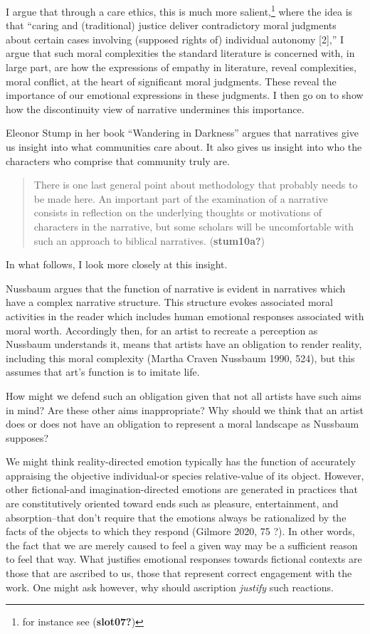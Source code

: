 \documentclass[12pt]{book}
\theoremstyle{definition}
\theoremstyle{remark}
\begin{document}
I argue that through a care ethics, this is much more salient,\footnote{for instance see (\textbf{slot07?})} where the idea is that ``caring and (traditional) justice deliver contradictory moral judgments about certain cases involving (supposed rights of) individual autonomy {[}2{]},'' I argue that such moral complexities the standard literature is concerned with, in large part, are how the expressions of empathy in literature, reveal complexities, moral conflict, at the heart of significant moral judgments. These reveal the importance of our emotional expressions in these judgments. I then go on to show how the discontinuity view of narrative undermines this importance.

Eleonor Stump in her book ``Wandering in Darkness'' argues that narratives give us insight into what communities care about. It also gives us insight into who the characters who comprise that community truly are.

\begin{quote}
There is one last general point about methodology that probably needs to be made here. An important part of the examination of a narrative consists in reflection on the underlying thoughts or motivations of characters in the narrative, but some scholars will be uncomfortable with such an approach to biblical narratives. (\textbf{stum10a?})
\end{quote}

\noindent In what follows, I look more closely at this insight.

Nussbaum argues that the function of narrative is evident in narratives which have a complex narrative structure. This structure evokes associated moral activities in the reader which includes human emotional responses associated with moral worth. Accordingly then, for an artist to recreate a perception as Nussbaum understands it, means that artists have an obligation to render reality, including this moral complexity (Martha Craven Nussbaum 1990, 524), but this assumes that art's function is to imitate life.

How might we defend such an obligation given that not all artists have such aims in mind? Are these other aims inappropriate? Why should we think that an artist does or does not have an obligation to represent a moral landscape as Nussbaum supposes?

We might think reality-directed emotion typically has the function of accurately appraising the objective individual-or species relative-value of its object. However, other fictional-and imagination-directed emotions are generated in practices that are constitutively oriented toward ends such as pleasure, entertainment, and absorption--that don't require that the emotions always be rationalized by the facts of the objects to which they respond (Gilmore 2020, 75 ?). In other words, the fact that we are merely caused to feel a given way may be a sufficient reason to feel that way. What justifies emotional responses towards fictional contexts are those that are ascribed to us, those that represent correct engagement with the work. One might ask however, why should ascription \emph{justify} such reactions.
\end{document}
